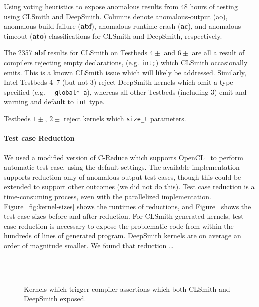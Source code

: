 \begin{table}
	\scriptsize %
	\centering %
	
	\caption{Using voting heuristics to expose anomalous results from 48 hours of testing using CLSmith and DeepSmith. Columns denote anomalous-output (ao), anomalous build failure (\textbf{abf}), anomalous runtime crash (\textbf{ac}), and anomalous timeout (\textbf{ato}) classifications for CLSmith and DeepSmith, respectively.  }
	\label{tab:classifications}
\end{table}

The 2357 \textbf{abf} results for CLSmith on Testbeds $4\pm$ and $6\pm$ are all a result of compilers rejecting empty declarations, (e.g. \texttt{int;}) which CLSmith occasionally emits. This is a known CLSmith issue which will likely be addressed.
Similarly, Intel Testbeds 4--7 (but not 3) reject DeepSmith kernels which omit a type specified (e.g. \texttt{\_\_global* a}), whereas all other Testbeds (including 3) emit and warning and default to \texttt{int} type.

Testbeds $1\pm$, $2\pm$ reject kernels which \texttt{size\_t} parameters.


\paragraph{Test case Reduction} We used a modified version of C-Reduce which supports OpenCL~\cite{Pflanzer2016} to perform automatic test case, using the default settings. The available implementation supports reduction only of anomalous-output test cases, though this could be extended to support other outcomes (we did not do this). Test case reduction is a time-consuming process, even with the parallelized implementation. Figure~\ref{fig:kernel-sizes} shows the runtimes of reductions, and Figure~ shows the test case sizes before and after reduction. For CLSmith-generated kernels, test case reduction is necessary to expose the problematic code from within the hundreds of lines of generated program. DeepSmith kernels are on average an order of magnitude smaller. We found that reduction \ldots


\begin{figure}
  \centering %
  \\%
  \\%
  \caption{Kernels which trigger compiler assertions which both CLSmith and DeepSmith exposed.}%
  \label{lst:clsmith-compiler-assertions}%
\end{figure}


